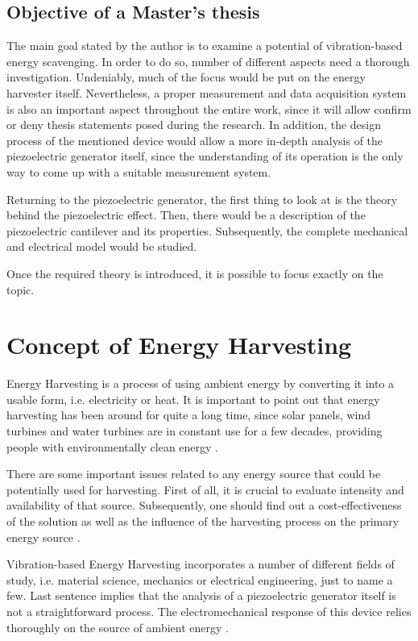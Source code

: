 \documentclass[12pt,a4paper]{article}
\begin{document}
\subsection{Objective of a Master's thesis}
The main goal stated by the author is to examine a potential of vibration-based energy scavenging. In order to do so, number of different aspects need a thorough investigation. Undeniably, much of the focus would be put on the energy harvester itself. Nevertheless, a proper measurement and data acquisition system is also an important aspect throughout the entire work, since it will allow confirm or deny thesis statements posed during the research. In addition, the design process of the mentioned device would allow a more in-depth analysis of the piezoelectric generator itself, since the understanding of its operation is the only way to come up with a suitable measurement system.
\par
Returning to the piezoelectric generator, the first thing to look at is the theory behind the piezoelectric effect. Then, there would be a description of the piezoelectric cantilever  and its properties. Subsequently, the complete mechanical and electrical model would be studied.
\par

Once the required theory is introduced, it is possible to focus exactly on the topic.

\section{Concept of Energy Harvesting}
Energy Harvesting is a process of using ambient energy by converting it into a usable form, i.e. electricity or heat. It is important to point out that energy harvesting has been around for quite a long time, since solar panels, wind turbines and water turbines are in constant use for a few decades, providing people with environmentally clean energy \cite{EnHv1}.
\par

There are some important issues related to any energy source that could be potentially used for harvesting. First of all, it is crucial to evaluate intensity and availability of that source. Subsequently, one should find out a cost-effectiveness of the solution as well as the influence of the harvesting process on the primary energy source \cite{EnHv1}.
\par

Vibration-based Energy Harvesting incorporates a number of different fields of study, i.e. material science, mechanics or electrical engineering, just to name a few. Last sentence implies that the analysis of a piezoelectric generator itself is not a straightforward process. The electromechanical response of this device relies thoroughly on the source of ambient energy \cite{EnHv2}.
\par
\end{document}
